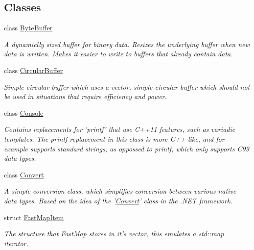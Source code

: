 \subsection*{Classes}
\begin{DoxyCompactItemize}
\item 
class \hyperlink{class_senergy_1_1_byte_buffer}{Byte\-Buffer}
\begin{DoxyCompactList}\small\item\em A dynamiclly sized buffer for binary data. Resizes the underlying buffer when new data is written. Makes it easier to write to buffers that already contain data. \end{DoxyCompactList}\item 
class \hyperlink{class_senergy_1_1_circular_buffer}{Circular\-Buffer}
\begin{DoxyCompactList}\small\item\em Simple circular buffer which uses a vector, simple circular buffer which should not be used in situations that require efficiency and power. \end{DoxyCompactList}\item 
class \hyperlink{class_senergy_1_1_console}{Console}
\begin{DoxyCompactList}\small\item\em Contains replacements for 'printf' that use C++11 features, such as variadic templates. The printf replacement in this class is more C++ like, and for example supports standard strings, as oppossed to printf, which only supports C99 data types. \end{DoxyCompactList}\item 
class \hyperlink{class_senergy_1_1_convert}{Convert}
\begin{DoxyCompactList}\small\item\em A simple conversion class, which simplifies conversion between various native data types. Based on the idea of the '\hyperlink{class_senergy_1_1_convert}{Convert}' class in the .N\-E\-T framework. \end{DoxyCompactList}\item 
struct \hyperlink{struct_senergy_1_1_fast_map_item}{Fast\-Map\-Item}
\begin{DoxyCompactList}\small\item\em The structure that \hyperlink{class_senergy_1_1_fast_map}{Fast\-Map} stores in it's vector, this emulates a std\-::map iterator. \end{DoxyCompactList}\item 

\end{DoxyCompactItemize}
